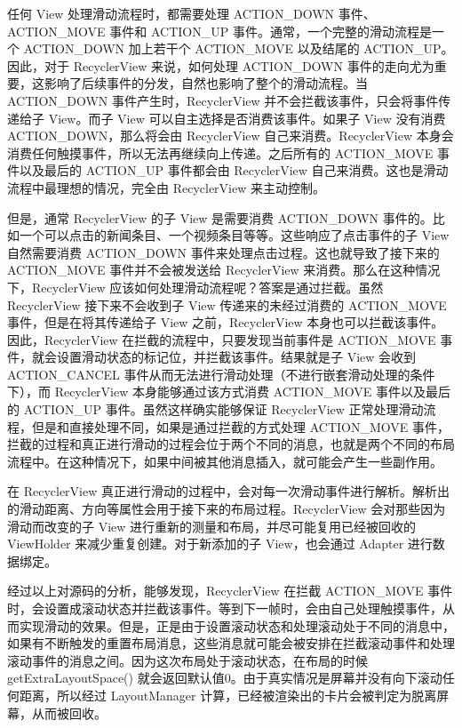 任何 View 处理滑动流程时，都需要处理 ACTION\_DOWN 事件、ACTION\_MOVE 事件和 ACTION\_UP 事件。通常，一个完整的滑动流程是一个 ACTION\_DOWN 加上若干个 ACTION\_MOVE 以及结尾的 ACTION\_UP。因此，对于 RecyclerView 来说，如何处理 ACTION\_DOWN 事件的走向尤为重要，这影响了后续事件的分发，自然也影响了整个的滑动流程。当 ACTION\_DOWN 事件产生时，RecyclerView 并不会拦截该事件，只会将事件传递给子 View。而子 View 可以自主选择是否消费该事件。如果子 View 没有消费 ACTION\_DOWN，那么将会由 RecyclerView 自己来消费。RecyclerView 本身会消费任何触摸事件，所以无法再继续向上传递。之后所有的 ACTION\_MOVE 事件以及最后的 ACTION\_UP 事件都会由 RecyclerView 自己来消费。这也是滑动流程中最理想的情况，完全由 RecyclerView 来主动控制。

但是，通常 RecyclerView 的子 View 是需要消费 ACTION\_DOWN 事件的。比如一个可以点击的新闻条目、一个视频条目等等。这些响应了点击事件的子 View 自然需要消费 ACTION\_DOWN 事件来处理点击过程。这也就导致了接下来的 ACTION\_MOVE 事件并不会被发送给 RecyclerView 来消费。那么在这种情况下，RecyclerView 应该如何处理滑动流程呢？答案是通过拦截。虽然 RecyclerView 接下来不会收到子 View 传递来的未经过消费的 ACTION\_MOVE 事件，但是在将其传递给子 View 之前，RecyclerView 本身也可以拦截该事件。因此，RecyclerView 在拦截的流程中，只要发现当前事件是 ACTION\_MOVE 事件，就会设置滑动状态的标记位，并拦截该事件。结果就是子 View 会收到 ACTION\_CANCEL 事件从而无法进行滑动处理（不进行嵌套滑动处理的条件下），而 RecyclerView 本身能够通过该方式消费 ACTION\_MOVE 事件以及最后的 ACTION\_UP 事件。虽然这样确实能够保证 RecyclerView 正常处理滑动流程，但是和直接处理不同，如果是通过拦截的方式处理 ACTION\_MOVE 事件，拦截的过程和真正进行滑动的过程会位于两个不同的消息，也就是两个不同的布局流程中。在这种情况下，如果中间被其他消息插入，就可能会产生一些副作用。

在 RecyclerView 真正进行滑动的过程中，会对每一次滑动事件进行解析。解析出的滑动距离、方向等属性会用于接下来的布局过程。RecyclerView 会对那些因为滑动而改变的子 View 进行重新的测量和布局，并尽可能复用已经被回收的 ViewHolder 来减少重复创建。对于新添加的子 View，也会通过 Adapter 进行数据绑定。

经过以上对源码的分析，能够发现，RecyclerView 在拦截 ACTION\_MOVE 事件时，会设置成滚动状态并拦截该事件。等到下一帧时，会由自己处理触摸事件，从而实现滑动的效果。但是，正是由于设置滚动状态和处理滚动处于不同的消息中，如果有不断触发的重置布局消息，这些消息就可能会被安排在拦截滚动事件和处理滚动事件的消息之间。因为这次布局处于滚动状态，在布局的时候 getExtraLayoutSpace() 就会返回默认值0。由于真实情况是屏幕并没有向下滚动任何距离，所以经过 LayoutManager 计算，已经被渲染出的卡片会被判定为脱离屏幕，从而被回收。

